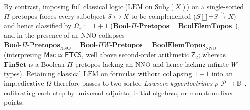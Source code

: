 By contrast, imposing full classical logic ($\mathrm{LEM}$ on $\mathrm{Sub}_{\mathcal{E}}(X)$) on a single-sorted $\Pi$-pretopos forces every subobject $S \rightarrowtail X$ to be complemented ($S \amalg \neg S \xrightarrow{\sim} X$) and hence classified by $\Omega_{\mathcal{E}} := 1 + 1$ ($\mathbf{Bool}\text{-}\Pi\text{-}\mathbf{Pretopos} = \mathbf{BoolElemTopos}$~\cite[Lemma~A1.4.3 \& Cor.~A2.1.6]{Johnstone02}), and in the presence of an $\mathrm{NNO}$ collapses $\mathbf{Bool}\text{-}\Pi\text{-}\mathbf{Pretopos}_{\mathrm{NNO}} = \mathbf{Bool}\text{-}\Pi W\text{-}\mathbf{Pretopos} = \mathbf{BoolElemTopos}_{\mathrm{NNO}}$ (interpreting $\mathsf{Mac} \simeq \mathsf{ETCS}$, well above second-order arithmetic $\mathsf{Z}_2$; whereas $\mathbf{FinSet}$ is a Boolean $\Pi$-pretopos lacking an $\mathrm{NNO}$ and hence lacking infinite $W$-types). Retaining classical $\mathrm{LEM}$ on formulas without collapsing $1 + 1$ into an impredicative $\Omega$ therefore passes to two-sorted \emph{Lawvere hyperdoctrines} $p : \mathcal{P} \to \mathbb{B}$~\cite{Lawvere69}, calibrating each step by universal adjoints, initial algebras, or monotone fixed points:


